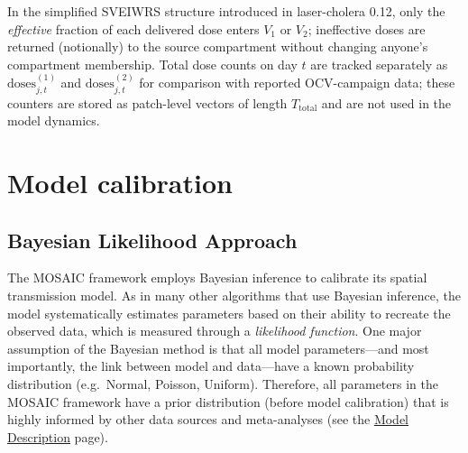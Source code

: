 \documentclass[
]{book}
\begin{document}
In the simplified SVEIWRS structure introduced in laser-cholera 0.12, only the \emph{effective} fraction of each delivered dose enters \(V_1\) or \(V_2\); ineffective doses are returned (notionally) to the source compartment without changing anyone's compartment membership. Total dose counts on day \(t\) are tracked separately as \(\text{doses}^{(1)}_{j,t}\) and \(\text{doses}^{(2)}_{j,t}\) for comparison with reported OCV-campaign data; these counters are stored as patch-level vectors of length \(T_{\text{total}}\) and are not used in the model dynamics.

\chapter{Model calibration}\label{model-calibration-1}

\section{Bayesian Likelihood Approach}\label{bayesian-likelihood-approach}

The MOSAIC framework employs Bayesian inference to calibrate its spatial transmission model. As in many other algorithms that use Bayesian inference, the model systematically estimates parameters based on their ability to recreate the observed data, which is measured through a \emph{likelihood function}. One major assumption of the Bayesian method is that all model parameters---and most importantly, the link between model and data---have a known probability distribution (e.g.~Normal, Poisson, Uniform). Therefore, all parameters in the MOSAIC framework have a prior distribution (before model calibration) that is highly informed by other data sources and meta-analyses (see the \href{https://www.mosaicmod.org/model-description.html}{Model Description} page).
\end{document}
